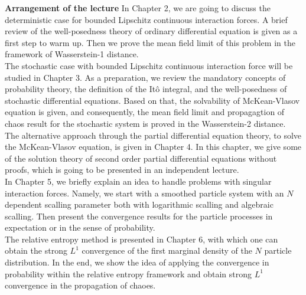 \newpage
{\bf Arrangement of the lecture}
In Chapter 2, we are going to discuss the deterministic case for bounded Lipschitz continuous interaction forces. A brief review of the well-posedness theory of ordinary
differential equation is given as a first step to warm up. Then we prove the mean field limit of this problem in the framework of Wasserstein-1 distance.\\[1ex]
The stochastic case with bounded Lipschitz continuous interaction force will be studied in Chapter 3. As a preparation, we review the mandatory concepts
of probability theory, the definition of the It\^{o} integral, and the well-posedness of stochastic differential equations. Based on that, the solvability of McKean-Vlasov equation is given, and consequently, the mean field limit and propagagtion of chaos result for the stochastic system is proved in the Wasserstein-2 distance. \\[1ex]
The alternative approach through the partial differential equation theory, to solve the McKean-Vlasov equation, is given in Chapter 4. In this chapter, we give some of the solution theory of second order partial differential equations without proofs, which is going to be presented in an independent lecture.\\[1ex]
In Chapter 5, we briefly explain an idea to handle problems with singular interaction forces. Namely, we start with a smoothed particle system with an $N$ dependent scalling parameter both with logarithmic scalling and algebraic scalling. Then present the convergence results for the particle processes in expectation or in the sense of probability. \\[1ex]
The relative entropy method is presented in Chapter 6, with which one can obtain the strong $L^1$ convergence of the first marginal density of the $N$ particle distribution. In the end, we show the idea of applying the convergence in probability within the relative entropy framework and obtain strong $L^1$ convergence in the propagation of chaoes. \\[1ex]

